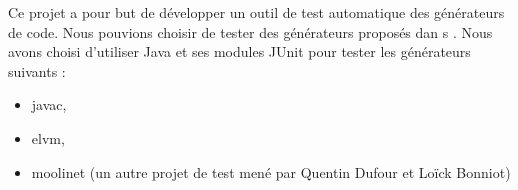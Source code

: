 \hspace{15pt}


Ce projet a pour but de développer un outil de test automatique des générateurs de code. Nous pouvions choisir de tester des générateurs proposés dan	s \cite{liste_generateurs}. Nous avons choisi d'utiliser Java et ses modules JUnit pour tester les générateurs suivants :

\begin{itemize}
    \item javac,
    \item elvm,
    \item moolinet (un autre projet de test mené par Quentin Dufour et Loïck Bonniot)
\end{itemize}
